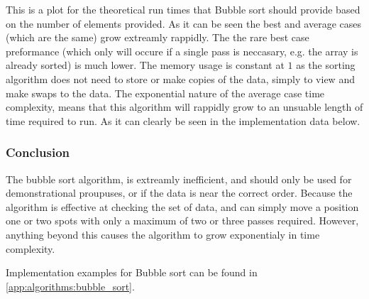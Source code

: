 \documentclass{subfile}
\begin{document}
\begin{multicols}{2}

     This is a plot for the theoretical run times that Bubble sort should
     provide based on the number of elements provided. As it can be seen the
     best and average cases (which are the same) grow extreamly rappidly. The
     the rare best case preformance (which only will occure if a single pass is
     neccasary, e.g. the array is already sorted) is much lower. The memory
     usage is constant at $1$ as the sorting algorithm does not need to store
     or make copies of the data, simply to view and make swaps to the data. The
     exponential nature of the average case time complexity, means that this
     algorithm will rappidly grow to an unsuable length of time required to
     run. As it can clearly be seen in the implementation data below.

     \subsubsection{Conclusion}
     \label{ssub:conclusion}
     
     The bubble sort algorithm, is extreamly inefficient, and should only be
     used for demonstrational proupuses, or if the data is near the correct
     order. Because the algorithm is effective at checking the set of data, and
     can simply move a position one or two spots with only a maximum of two or
     three passes required. However, anything beyond this causes the algorithm
     to grow exponentialy in time complexity.

     Implementation examples for Bubble sort can be found in
     \ref{app:algorithms:bubble_sort}.
   \end{multicols}
\end{document}
